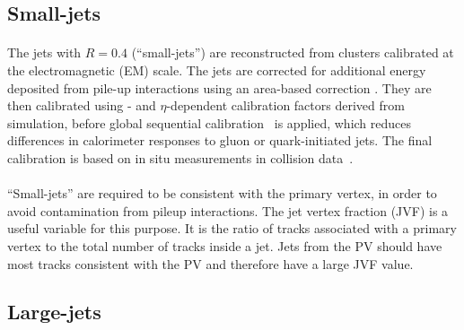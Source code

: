 \subsection{Small-\R jets}
\paragraph{}
The jets with $R=0.4$ (``small-\R jets'') are reconstructed from clusters calibrated at the electromagnetic (EM) scale. The jets are corrected for additional energy deposited from pile-up interactions using an area-based correction \cite{Cacciari:2008gn}. 
They are then calibrated using \pt- and $\eta$-dependent calibration factors derived from simulation, before global sequential calibration~\cite{Aad:2011he} is applied, which reduces differences in calorimeter responses to gluon or quark-initiated jets. 
The final calibration is based on in situ measurements in collision data~\cite{ATL-PHYS-PUB-2015-015}.

\paragraph{}
``Small-\R jets'' are required to be consistent with the primary vertex, in order to avoid contamination from pileup interactions. 
The jet vertex fraction (JVF) is a useful variable for this purpose. 
It is the ratio of tracks associated with a primary vertex to the total number of tracks inside a jet. 
Jets from the PV should have most tracks consistent with the PV and therefore have a large JVF value.

\subsection{Large-\R jets}

